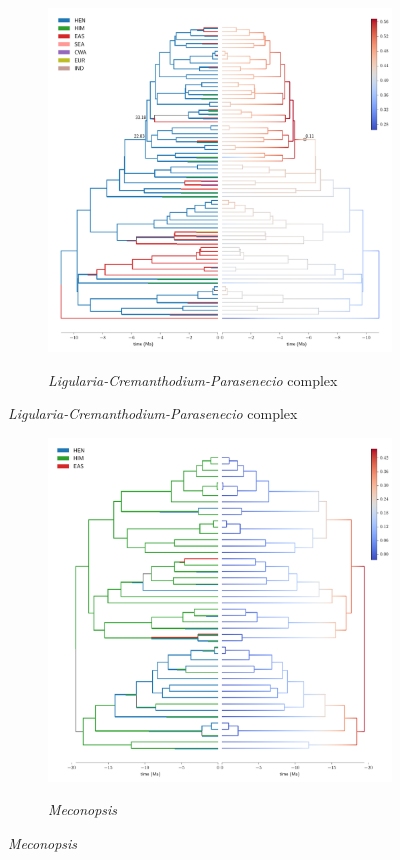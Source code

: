 \begin{figure}
  \ContinuedFloat
\begin{subfigure}{\textwidth}
\centering
\includegraphics[width=.99\linewidth]{figures/Ligularia-supfig.pdf}
\label{fig:allium}
\caption{\textit{Ligularia-Cremanthodium-Parasenecio} complex}
\end{subfigure}
\end{figure}

\begin{figure}
  \ContinuedFloat
\begin{subfigure}{\textwidth}
\centering
\includegraphics[width=.99\linewidth]{figures/Meconopsis-supfig.pdf}
\label{fig:allium}
\caption{\textit{Meconopsis}}
\end{subfigure}
\end{figure}

